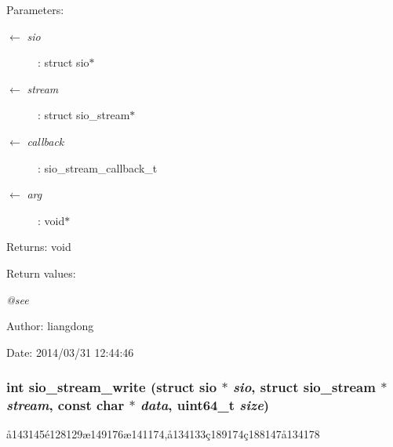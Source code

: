 \begin{Desc}
\item[Parameters:]
\begin{description}
\item[\mbox{$\leftarrow$} {\em sio}]: struct sio$\ast$ \item[\mbox{$\leftarrow$} {\em stream}]: struct sio\_\-stream$\ast$ \item[\mbox{$\leftarrow$} {\em callback}]: sio\_\-stream\_\-callback\_\-t \item[\mbox{$\leftarrow$} {\em arg}]: void$\ast$ \end{description}
\end{Desc}
\begin{Desc}
\item[Returns:]void \end{Desc}
\begin{Desc}
\item[Return values:]
\begin{description}
\item[{\em @see}]\end{description}
\end{Desc}
\begin{Desc}
\item[Author:]liangdong \end{Desc}
\begin{Desc}
\item[Date:]2014/03/31 12:44:46 \end{Desc}
\subsubsection{\setlength{\rightskip}{0pt plus 5cm}int sio\_\-stream\_\-write (struct sio $\ast$ {\em sio}, struct sio\_\-stream $\ast$ {\em stream}, const char $\ast$ {\em data}, uint64\_\-t {\em size})}\label{sio__stream_8h_a14}


\aa{}143145\'{e}128129\ae{}149176\ae{}141174,\aa{}134133\c{c}189174\c{c}188147\aa{}134178 

